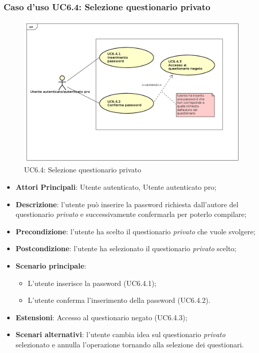 \subsubsection{Caso d'uso UC6.4: Selezione questionario privato}
\label{UC6.4}
\begin{figure}[h]
\centering
\includegraphics[scale=0.5,keepaspectratio]{UML/UC6_4.png}
\caption{UC6.4: Selezione questionario privato}
\end{figure}
\FloatBarrier
\begin{itemize}
\item\textbf{Attori Principali}: Utente autenticato, Utente autenticato pro;
\item\textbf{Descrizione}: l'utente può inserire la password richiesta dall'autore del questionario \textit{privato} e successivamente confermarla per poterlo compilare;
\item\textbf{Precondizione}: l'utente ha scelto il questionario \textit{privato} che vuole svolgere;
\item\textbf{Postcondizione}: l'utente ha selezionato il questionario \textit{privato} scelto;
\item\textbf{Scenario principale}:
\begin{itemize}
\item L'utente inserisce la password (UC6.4.1);
\item L'utente conferma l'inserimento della password (UC6.4.2).
\end{itemize}
\item\textbf{Estensioni}: Accesso al questionario negato (UC6.4.3);
\item\textbf{Scenari alternativi}: l'utente cambia idea sul questionario \textit{privato} selezionato e annulla l'operazione tornando alla selezione dei questionari.
\end{itemize}

